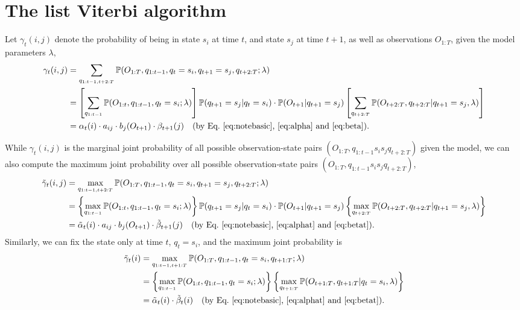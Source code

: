 \section{The list Viterbi algorithm}
\label{sec:lva}

Let $\gamma_t(i,j)$ denote the probability of being in state $s_i$ at time $t$, and state $s_j$ at time $t\!+\!1$, 
as well as observations $O_{1:T}$, given the model parameters $\lambda$, \ie
\begin{equation}
\label{eq:gamma}
\begin{aligned}
\gamma_t(i,j) 
&= \sum_{q_{1:t-1,t+2:T}} \mathbb{P}(O_{1:T}, q_{1:t-1}, q_t = s_i, q_{t+1} = s_j, q_{t+2:T} ;\lambda) \\
&= \left[ \sum_{q_{1:t-1}} \mathbb{P}(O_{1:t}, q_{1:t-1}, q_t = s_i ;\lambda) \right] \mathbb{P}(q_{t+1} = s_j |q_t = s_i) \cdot \mathbb{P}(O_{t+1} |q_{t+1} = s_j) 
   \left[ \sum_{q_{t+2:T}} \mathbb{P}(O_{t+2:T}, q_{t+2:T} |q_{t+1} = s_j, \lambda) \right] \\
&= \alpha_t(i) \cdot a_{ij} \cdot b_j(O_{t+1}) \cdot \beta_{t+1}(j) 
   ~~~ \text{(by Eq.~\ref{eq:notebasic}, \ref{eq:alpha} and \ref{eq:beta})}.
\end{aligned}
\end{equation}

While $\gamma_t(i,j)$ is the marginal joint probability of all possible observation-state pairs $(O_{1:T}, q_{1:t-1} s_i s_j q_{t+2:T})$ given the model,
we can also compute the maximum joint probability over all possible observation-state pairs $(O_{1:T}, q_{1:t-1} s_i s_j q_{t+2:T})$, \ie
\begin{equation}
\label{eq:gammat}
\begin{aligned}
\tilde{\gamma}_t(i,j) 
&= \max_{q_{1:t-1,t+2:T}} \mathbb{P}(O_{1:T}, q_{1:t-1}, q_t = s_i, q_{t+1} = s_j, q_{t+2:T} ;\lambda) \\
&= \left\{ \max_{q_{1:t-1}} \mathbb{P}(O_{1:t}, q_{1:t-1}, q_t = s_i ;\lambda) \right\} \mathbb{P}(q_{t+1} = s_j |q_t = s_i) \cdot \mathbb{P}(O_{t+1} |q_{t+1} = s_j) 
   \left\{ \max_{q_{t+2:T}} \mathbb{P}(O_{t+2:T}, q_{t+2:T} |q_{t+1} = s_j, \lambda) \right\} \\
&= \tilde{\alpha}_t(i) \cdot a_{ij} \cdot b_j(O_{t+1}) \cdot \tilde{\beta}_{t+1}(j) 
   ~~~ \text{(by Eq.~\ref{eq:notebasic}, \ref{eq:alphat} and \ref{eq:betat})}.
\end{aligned}
\end{equation}
Similarly, we can fix the state only at time $t$, \ie $q_t = s_i$, 
and the maximum joint probability is
\begin{equation}
\label{eq:gammat0}
\begin{aligned}
\tilde{\gamma}_t(i) 
&= \max_{q_{1:t-1,t+1:T}} \mathbb{P}(O_{1:T}, q_{1:t-1}, q_t = s_i, q_{t+1:T} ;\lambda) \\
&= \left\{ \max_{q_{1:t-1}} \mathbb{P}(O_{1:t}, q_{1:t-1}, q_t = s_i ;\lambda) \right\}  
   \left\{ \max_{q_{t+1:T}} \mathbb{P}(O_{t+1:T}, q_{t+1:T} |q_t = s_i, \lambda) \right\} \\
&= \tilde{\alpha}_t(i) \cdot \tilde{\beta}_t(i) 
   ~~~ \text{(by Eq.~\ref{eq:notebasic}, \ref{eq:alphat} and \ref{eq:betat})}.
\end{aligned}
\end{equation}

